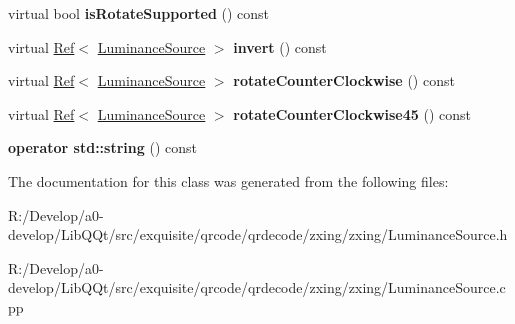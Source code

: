 \begin{DoxyCompactItemize}
virtual bool {\bfseries is\+Rotate\+Supported} () const
\item 
\mbox{\label{classzxing_1_1_luminance_source_a5386774231dd86f10b3f4685860eb830}} 
virtual \mbox{\hyperlink{classzxing_1_1_ref}{Ref}}$<$ \mbox{\hyperlink{classzxing_1_1_luminance_source}{Luminance\+Source}} $>$ {\bfseries invert} () const
\item 
\mbox{\label{classzxing_1_1_luminance_source_af4d5d927ed080c2420a31d878ab35557}} 
virtual \mbox{\hyperlink{classzxing_1_1_ref}{Ref}}$<$ \mbox{\hyperlink{classzxing_1_1_luminance_source}{Luminance\+Source}} $>$ {\bfseries rotate\+Counter\+Clockwise} () const
\item 
\mbox{\label{classzxing_1_1_luminance_source_a0f242877cb35f60c801a13f88c4f96c0}} 
virtual \mbox{\hyperlink{classzxing_1_1_ref}{Ref}}$<$ \mbox{\hyperlink{classzxing_1_1_luminance_source}{Luminance\+Source}} $>$ {\bfseries rotate\+Counter\+Clockwise45} () const
\item 
\mbox{\label{classzxing_1_1_luminance_source_a222d9bb08765823d6d3e7e3a6e7b0a3e}} 
{\bfseries operator std\+::string} () const
\end{DoxyCompactItemize}


The documentation for this class was generated from the following files\+:\begin{DoxyCompactItemize}
\item 
R\+:/\+Develop/a0-\/develop/\+Lib\+Q\+Qt/src/exquisite/qrcode/qrdecode/zxing/zxing/Luminance\+Source.\+h\item 
R\+:/\+Develop/a0-\/develop/\+Lib\+Q\+Qt/src/exquisite/qrcode/qrdecode/zxing/zxing/Luminance\+Source.\+cpp\end{DoxyCompactItemize}
